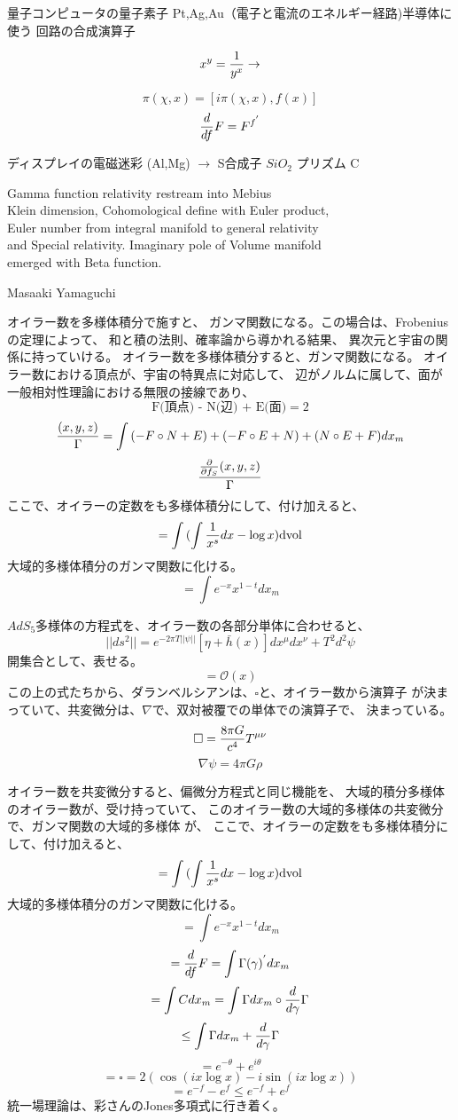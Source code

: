\documentclass{jsarticle}
\begin{document}
{  量子コンピュータの量子素子 Pt,Ag,Au（電子と電流のエネルギー経路)半導体に
  使う
  回路の合成演算子 


  $$ x^y = {1 \over {y^x}} \to $$

  $$ \pi(\chi,x) = [i\pi(\chi,x),f(x)] $$
  $$ {d \over df}F = F^{{f}^{'}} $$


  ディスプレイの電磁迷彩 (Al,Mg) $\to$ S合成子 $Si O_2 $
  プリズム C

\begin{center}
	Gamma function relativity restream into Mebius \\
Klein dimension, Cohomological define with Euler product, \\
Euler number from integral manifold to general relativity \\
and Special relativity. Imaginary pole of Volume manifold \\
emerged with Beta function.
\end{center}
\begin{center}
	Masaaki Yamaguchi
\end{center}

        オイラー数を多様体積分で施すと、
   ガンマ関数になる。この場合は、Frobeniusの定理によって、
   和と積の法則、確率論から導かれる結果、
   異次元と宇宙の関係に持っていける。
   オイラー数を多様体積分すると、ガンマ関数になる。
   オイラー数における頂点が、宇宙の特異点に対応して、
   辺がノルムに属して、面が一般相対性理論における無限の接線であり、
   $$ \text{F(頂点) - N(辺) + E(面)} = 2 $$
   $$ {(x,y,z) \over \Gamma} = \int{(- F\circ N + E)} + 
   (-F\circ E + N) + (N\circ E + F)dx_m $$
   $$ {{{\partial \over \partial f_S}(x,y,z)} \over {\Gamma}} $$
   ここで、オイラーの定数をも多様体積分にして、付け加えると、
   $$ = \int{({\int {1 \over x^s}dx} - \log x)}\mathrm{dvol} $$
   大域的多様体積分のガンマ関数に化ける。
   $$ = \int e^{-x}x^{1 - t}dx_m $$

   $AdS_5$多様体の方程式を、オイラー数の各部分単体に合わせると、
   $$ ||ds^2|| = e^{-2\pi T||\psi||}[\eta + \bar{h}(x)]dx^{\mu}dx^{\nu} 
   + T^2d^2 \psi $$
   開集合として、表せる。
   $$ = \mathcal{O}(x) $$
   この上の式たちから、ダランベルシアンは、$\square$と、オイラー数から演算子
   が決まっていて、共変微分は、$\nabla$で、双対被覆での単体での演算子で、
   決まっている。
   $$ \square = {{8 \pi G} \over c^4} T^{\mu\nu} $$
   $$ \nabla \psi = 4 \pi G \rho $$

   オイラー数を共変微分すると、偏微分方程式と同じ機能を、
   大域的積分多様体のオイラー数が、受け持っていて、
   このオイラー数の大域的多様体の共変微分で、ガンマ関数の大域的多様体
   が、
   ここで、オイラーの定数をも多様体積分にして、付け加えると、
   $$ = \int{({\int {1 \over x^s}dx} - \log x)}\mathrm{dvol} $$
   大域的多様体積分のガンマ関数に化ける。
   $$ = \int e^{-x}x^{1 - t}dx_m $$
   $$ = {d \over d f}F = \int \Gamma(\gamma)^{'}dx_m $$
   $$ = \int C dx_m = \int \Gamma dx_m \circ {d \over d \gamma}\Gamma $$
   $$ \le \int \Gamma dx_m + {d \over d \gamma}\Gamma $$
   $$ = e^{- \theta} + e^{i \theta} $$
   $$ = \square = 2(\cos (i x \log x) - i \sin (i x \log x))$$
   $$ = e^{-f} - e^{f} \le e^{-f} + e^{f} $$
   統一場理論は、彩さんのJones多項式に行き着く。

}
\end{document}
